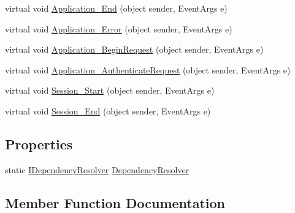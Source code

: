 \begin{DoxyCompactItemize}
virtual void \hyperlink{classCqrs_1_1WebApi_1_1CqrsHttpApplication_a3402481d96af628677e4b45c85eb889e}{Application\+\_\+\+End} (object sender, Event\+Args e)
\item 
virtual void \hyperlink{classCqrs_1_1WebApi_1_1CqrsHttpApplication_aa7d796b928c48da0505432ffb4088c5f}{Application\+\_\+\+Error} (object sender, Event\+Args e)
\item 
virtual void \hyperlink{classCqrs_1_1WebApi_1_1CqrsHttpApplication_aa5df227fdef4605d0bbd353066f2b3f1}{Application\+\_\+\+Begin\+Request} (object sender, Event\+Args e)
\item 
virtual void \hyperlink{classCqrs_1_1WebApi_1_1CqrsHttpApplication_aa8f9a572804c8c686c2381029c20c303}{Application\+\_\+\+Authenticate\+Request} (object sender, Event\+Args e)
\item 
virtual void \hyperlink{classCqrs_1_1WebApi_1_1CqrsHttpApplication_a51f539501f607c3ecae6530120c129eb}{Session\+\_\+\+Start} (object sender, Event\+Args e)
\item 
virtual void \hyperlink{classCqrs_1_1WebApi_1_1CqrsHttpApplication_a72e04b9b77ef87292801f8b65edace1e}{Session\+\_\+\+End} (object sender, Event\+Args e)
\end{DoxyCompactItemize}
\subsection*{Properties}
\begin{DoxyCompactItemize}
\item 
static \hyperlink{interfaceCqrs_1_1Configuration_1_1IDependencyResolver}{I\+Dependency\+Resolver} \hyperlink{classCqrs_1_1WebApi_1_1CqrsHttpApplication_a9d6bd681b84a94ae58abdb0b5cf2cbfd}{Dependency\+Resolver}
\end{DoxyCompactItemize}


\subsection{Member Function Documentation}
\mbox{\label{classCqrs_1_1WebApi_1_1CqrsHttpApplication_aa8f9a572804c8c686c2381029c20c303}} 
